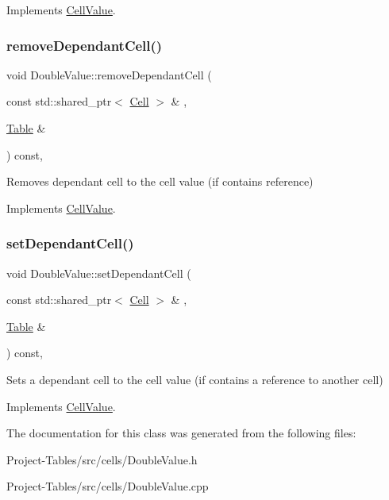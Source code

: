 Implements \hyperlink{classCellValue_a12d1cf68a5ba83f0c375441729772742}{Cell\+Value}.

\mbox{\label{classDoubleValue_a7ec7477ff3eb36e7e012912c674850e4}} 
\subsubsection{\texorpdfstring{remove\+Dependant\+Cell()}{removeDependantCell()}}
{\footnotesize\ttfamily void Double\+Value\+::remove\+Dependant\+Cell (\begin{DoxyParamCaption}\item[{const std\+::shared\+\_\+ptr$<$ \hyperlink{classCell}{Cell} $>$ \&}]{,  }\item[{\hyperlink{classTable}{Table} \&}]{ }\end{DoxyParamCaption}) const\hspace{0.3cm}{\ttfamily [override]}, {\ttfamily [virtual]}}

Removes dependant cell to the cell value (if contains reference) 

Implements \hyperlink{classCellValue_a72b4390db6c53e525550cefade66fb0e}{Cell\+Value}.

\mbox{\label{classDoubleValue_a59437f80b42c8f3c058b87002e1fe0ec}} 
\subsubsection{\texorpdfstring{set\+Dependant\+Cell()}{setDependantCell()}}
{\footnotesize\ttfamily void Double\+Value\+::set\+Dependant\+Cell (\begin{DoxyParamCaption}\item[{const std\+::shared\+\_\+ptr$<$ \hyperlink{classCell}{Cell} $>$ \&}]{,  }\item[{\hyperlink{classTable}{Table} \&}]{ }\end{DoxyParamCaption}) const\hspace{0.3cm}{\ttfamily [override]}, {\ttfamily [virtual]}}

Sets a dependant cell to the cell value (if contains a reference to another cell) 

Implements \hyperlink{classCellValue_ad2437fb3d4d4a96d9a76c857b3d04231}{Cell\+Value}.



The documentation for this class was generated from the following files\+:\begin{DoxyCompactItemize}
\item 
Project-\/\+Tables/src/cells/Double\+Value.\+h\item 
Project-\/\+Tables/src/cells/Double\+Value.\+cpp\end{DoxyCompactItemize}

